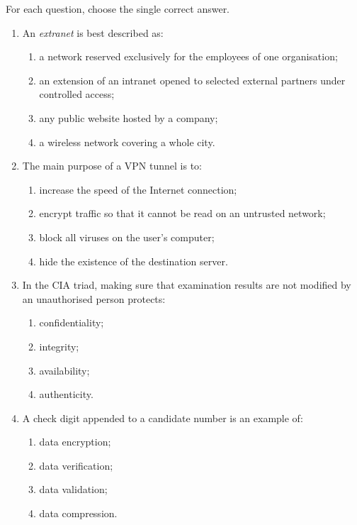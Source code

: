 \documentclass[11pt]{article}
\begin{document}
\begin{exercice}
For each question, choose the single correct answer.
\begin{enumerate}
\item An \emph{extranet} is best described as:
\begin{enumerate}
\item a network reserved exclusively for the employees of one organisation;
\item an extension of an intranet opened to selected external partners under controlled access;
\item any public website hosted by a company;
\item a wireless network covering a whole city.
\end{enumerate}
\item The main purpose of a VPN tunnel is to:
\begin{enumerate}
\item increase the speed of the Internet connection;
\item encrypt traffic so that it cannot be read on an untrusted network;
\item block all viruses on the user's computer;
\item hide the existence of the destination server.
\end{enumerate}
\item In the CIA triad, making sure that examination results are not modified by an unauthorised person protects:
\begin{enumerate}
\item confidentiality;
\item integrity;
\item availability;
\item authenticity.
\end{enumerate}
\item A check digit appended to a candidate number is an example of:
\begin{enumerate}
\item data encryption;
\item data verification;
\item data validation;
\item data compression.
\end{enumerate}
\end{enumerate}
\end{exercice}
\end{document}
